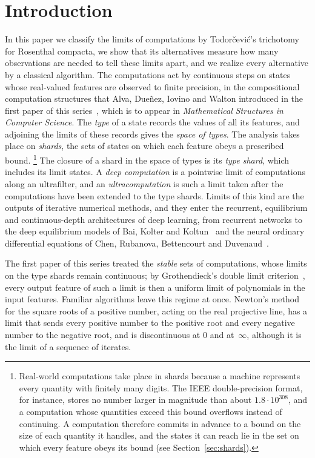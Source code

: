 \documentclass[psamsfonts]{amsart}
\theoremstyle{definition}
\theoremstyle{remark}
\numberwithin{equation}{section}
\begin{document}
\section*{Introduction}

In this paper we classify the limits of computations by Todorčević's trichotomy for Rosenthal compacta, we show that its alternatives measure how many observations are needed to tell these limits apart, and we realize every alternative by a classical algorithm.
The computations act by continuous steps on states whose real-valued features are observed to finite precision, in the compositional computation structures that Alva, Dueñez, Iovino and Walton introduced in the first paper of this series~\cite{alva2024approximability}, which is to appear in \emph{Mathematical Structures in Computer Science}.
The \emph{type} of a state records the values of all its features, and adjoining the limits of these records gives the \emph{space of types}.
The analysis takes place on \emph{shards}, the sets of states on which each feature obeys a prescribed bound.%
\footnote{Real-world computations take place in shards because a machine represents every quantity with finitely many digits.
  The IEEE double-precision format, for instance, stores no number larger in magnitude than about $1.8\cdot10^{308}$, and a computation whose quantities exceed this bound overflows instead of continuing.
  A computation therefore commits in advance to a bound on the size of each quantity it handles, and the states it can reach lie in the set on which every feature obeys its bound (see Section~\ref{sec:shards}).}
The closure of a shard in the space of types is its \emph{type shard}, which includes its limit states.
A \emph{deep computation} is a pointwise limit of computations along an ultrafilter, and an \emph{ultracomputation} is such a limit taken after the computations have been extended to the type shards.
Limits of this kind are the outputs of iterative numerical methods, and they enter the recurrent, equilibrium and continuous-depth architectures of deep learning, from recurrent networks to the deep equilibrium models of Bai, Kolter and Koltun~\cite{Bai:2019} and the neural ordinary differential equations of Chen, Rubanova, Bettencourt and Duvenaud~\cite{Chen:2018}.

The first paper of this series treated the \emph{stable} sets of computations, whose limits on the type shards remain continuous; by Grothendieck's double limit criterion~\cite{Grothendieck:1952}, every output feature of such a limit is then a uniform limit of polynomials in the input features.
Familiar algorithms leave this regime at once.
Newton's method for the square roots of a positive number, acting on the real projective line, has a limit that sends every positive number to the positive root and every negative number to the negative root, and is discontinuous at $0$ and at~$\infty$, although it is the limit of a sequence of iterates.
\end{document}
